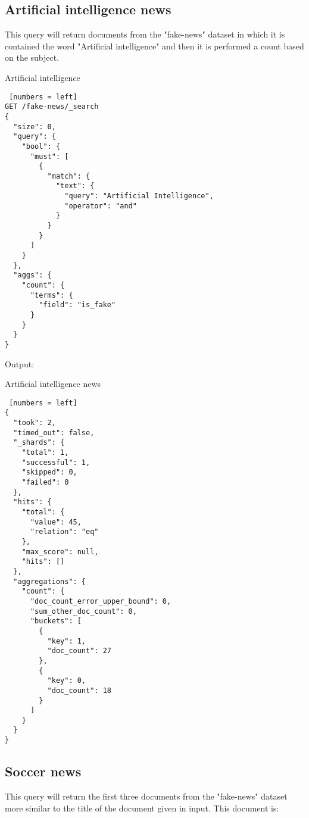 \subsection{Artificial intelligence news}
This query will return documents from the "fake-news" dataset in which it is contained the word "Artificial intelligence" and then it is performed a count based on the subject.\\

\begin{algorithm}[h!]
\caption{Artificial intelligence}
\begin{lstlisting} [numbers = left]
GET /fake-news/_search
{
  "size": 0,
  "query": {
    "bool": {
      "must": [
        {
          "match": {
            "text": {
              "query": "Artificial Intelligence",
              "operator": "and"
            }
          }
        }
      ]
    }
  },
  "aggs": {
    "count": {
      "terms": {
        "field": "is_fake"
      }
    }
  }
}
\end{lstlisting}
\end{algorithm}

\newpage

Output:
\begin{algorithm}[h!]
\caption{Artificial intelligence news}
\begin{lstlisting} [numbers = left]
{
  "took": 2,
  "timed_out": false,
  "_shards": {
    "total": 1,
    "successful": 1,
    "skipped": 0,
    "failed": 0
  },
  "hits": {
    "total": {
      "value": 45,
      "relation": "eq"
    },
    "max_score": null,
    "hits": []
  },
  "aggregations": {
    "count": {
      "doc_count_error_upper_bound": 0,
      "sum_other_doc_count": 0,
      "buckets": [
        {
          "key": 1,
          "doc_count": 27
        },
        {
          "key": 0,
          "doc_count": 18
        }
      ]
    }
  }
}

\end{lstlisting}
\end{algorithm}
\newpage


\subsection{Soccer news}
This query will return the first three documents from the "fake-news" dataset more similar to the title of the document given in input. This document is: \\

